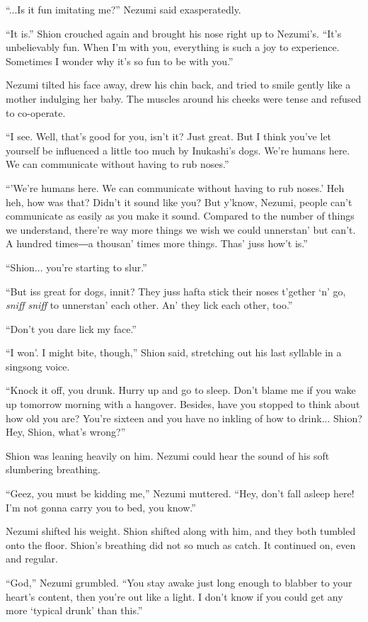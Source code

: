 ``...Is it fun imitating me?'' Nezumi said exasperatedly.

``It is.'' Shion crouched again and brought his nose right up to
Nezumi's. ``It's unbelievably fun. When I'm with you, everything is such
a joy to experience. Sometimes I wonder why it's so fun to be with
you.''

Nezumi tilted his face away, drew his chin back, and tried to smile
gently like a mother indulging her baby. The muscles around his cheeks
were tense and refused to co-operate.

``I see. Well, that's good for you, isn't it? Just great. But I think
you've let yourself be influenced a little too much by Inukashi's dogs.
We're humans here. We can communicate without having to rub noses.''

``'We're humans here. We can communicate without having to rub noses.'
Heh heh, how was that? Didn't it sound like you? But y'know, Nezumi,
people can't communicate as easily as you make it sound. Compared to the
number of things we understand, there're way more things we wish we
could unnerstan' but can't. A hundred times―a thousan' times more
things. Thas' juss how't is.''

``Shion... you're starting to slur.''

``But iss great for dogs, innit? They juss hafta stick their noses
t'gether `n' go, \emph{sniff sniff} to unnerstan' each other. An' they lick
each other, too.''

``Don't you dare lick my face.''

``I won'. I might bite, though,'' Shion said, stretching out his last
syllable in a singsong voice.

``Knock it off, you drunk. Hurry up and go to sleep. Don't blame me if
you wake up tomorrow morning with a hangover. Besides, have you stopped
to think about how old you are? You're sixteen and you have no inkling
of how to drink... Shion? Hey, Shion, what's wrong?''

Shion was leaning heavily on him. Nezumi could hear the sound of his
soft slumbering breathing.

``Geez, you must be kidding me,'' Nezumi muttered. ``Hey, don't fall
asleep here! I'm not gonna carry you to bed, you know.''

Nezumi shifted his weight. Shion shifted along with him, and they both
tumbled onto the floor. Shion's breathing did not so much as catch. It
continued on, even and regular.

``God,'' Nezumi grumbled. ``You stay awake just long enough to blabber
to your heart's content, then you're out like a light. I don't know if
you could get any more `typical drunk' than this.''

